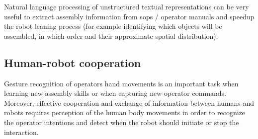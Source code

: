Natural language processing of unstructured textual representations can be very useful to extract assembly information from \glspl{sop} / operator manuals \cite{Stenmark2014,Stenmark2013} and speedup the robot leaning process \cite{Tenorth2010} (for example identifying which objects will be assembled, in which order and their approximate spatial distribution).



\subsection{Human-robot cooperation}

Gesture recognition of operators hand movements \cite{Gleeson2013} is an important task when learning new assembly skills or when capturing new operator commands. Moreover, effective cooperation and exchange of information between humans and robots requires perception of the human body movements \cite{Roitberg2014} in order to recognize the operator intentions and detect when the robot should initiate or stop the interaction.


%



